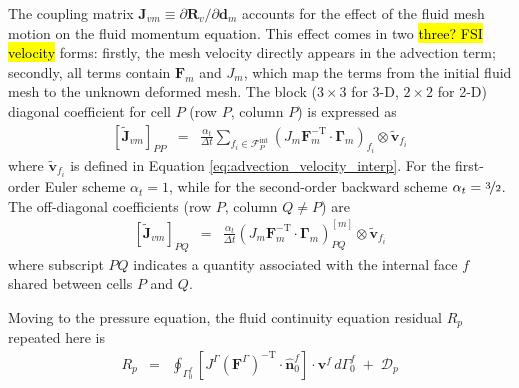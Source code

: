 \documentclass[sn-mathphys,Numbered]{sn-jnl}%
\newcommand{\bb}{\boldsymbol}
\begin{document}
The coupling matrix $\bb{J}_{vm} \equiv \partial \bb{R}_{v}/\partial \bb{d}_m$ accounts for the effect of the fluid mesh motion on the fluid momentum equation.
This effect comes in two \hl{three? FSI velocity} forms: firstly, the mesh velocity directly appears in the advection term; secondly, all terms contain $\bb{F}_m$ and $J_m$, which map the terms from the initial fluid mesh to the unknown deformed mesh.
The block ($3\times3$ for 3-D, $2\times2$ for 2-D) diagonal coefficient for cell $P$ (row $P$, column $P$) is expressed as
\begin{eqnarray}
	 \left[ \tilde{\bb{J}}_{vm} \right]_{PP} &=&
		 \frac{\alpha_t}{\Delta t} \sum_{f_i \in \mathcal{F}^{\text{int}}_P}
		 \left(J_m \bb{F}_m^{-\text{T}} \cdot \bb{\Gamma}_m \right)_{f_i} \otimes \tilde{\bb{v}}_{f_i}
\end{eqnarray}
where $\tilde{\bb{v}}_{f_i}$ is defined in Equation \ref{eq:advection_velocity_interp}.
For the first-order Euler scheme $\alpha_t = 1$, while for the second-order backward scheme $\alpha_t = \nicefrac{3}{2}$.
The off-diagonal coefficients (row $P$, column $Q \neq P$) are
\begin{eqnarray}
	 \left[ \tilde{\bb{J}}_{vm} \right]_{PQ} &=&
	 	 \frac{\alpha_t}{\Delta t} \left(J_m \bb{F}_m^{-\text{T}} \cdot \bb{\Gamma}_m \right)_{PQ}^{[m]} \otimes \tilde{\bb{v}}_{f_i}
\end{eqnarray}
where subscript $PQ$ indicates a quantity associated with the internal face $f$ shared between cells $P$ and $Q$.



Moving to the pressure equation, the fluid continuity equation residual $R_p$ repeated here is
\begin{eqnarray}
    R_p    &=&	\oint_{\Gamma^f_0}  \left[ J^\Gamma (\bb{F}^\Gamma)^{-\text{T}}  \cdot \hat{\bb{n}}_0^f \right] \cdot \bb{v}^f \, d\Gamma^f_0 \;+\; \mathcal{D}_p
\end{eqnarray}
\end{document}
